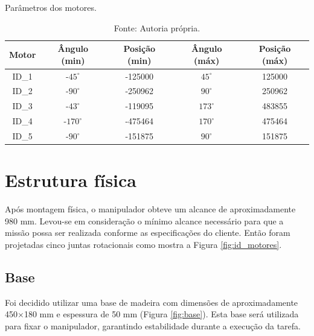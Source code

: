 \begin{table}[H]
    \centering
    \caption{Parâmetros dos motores.}
    \begin{tabular}{|c|c|c|c|c|}
    \hline
    \rowcolor[HTML]{EFEFEF} 
    Motor & Ângulo (min) & Posição (min) & Ângulo (máx) & Posição (máx) \\ \hline
    \rowcolor[HTML]{FFFFFF} 
    ID\_1 & -$45^\circ$         & -125000       & $45^\circ$         & 125000        \\ \hline
    \rowcolor[HTML]{EFEFEF} 
    ID\_2 & -$90^\circ$         & -250962       & $90^\circ$          & 250962        \\ \hline
    \rowcolor[HTML]{FFFFFF} 
    ID\_3 & -$43^\circ$         & -119095          & $173^\circ$         & 483855          \\ \hline
    \rowcolor[HTML]{EFEFEF} 
    ID\_4 & -$170^\circ$        & -475464       & $170^\circ$         & 475464        \\ \hline
    \rowcolor[HTML]{FFFFFF} 
    ID\_5 & -$90^\circ$         & -151875       & $90^\circ$          & 151875        \\ \hline
    \end{tabular}
    \label{tab:params_motores}
    \caption*{Fonte: Autoria própria.}
\end{table}

\section{Estrutura física}
Após montagem física, o manipulador obteve um alcance de aproximadamente 980 mm. Levou-se em consideração o mínimo alcance necessário para que a missão possa ser realizada conforme as especificações do cliente. Então foram projetadas cinco juntas rotacionais como mostra a Figura \ref{fig:id_motores}.

\subsection{Base}
Foi decidido utilizar uma base de madeira com dimensões de aproximadamente 450$\times$180 mm e espessura de 50 mm (Figura \ref{fig:base}). Esta base será utilizada para fixar o manipulador, garantindo estabilidade durante a execução da tarefa. 

